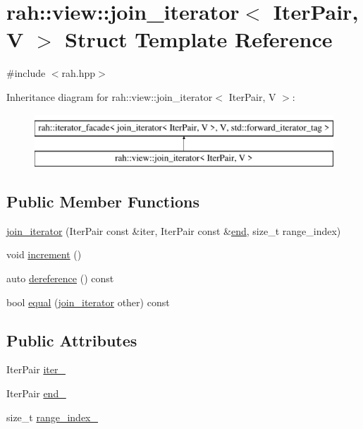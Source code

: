 \hypertarget{structrah_1_1view_1_1join__iterator}{}\section{rah\+::view\+::join\+\_\+iterator$<$ Iter\+Pair, V $>$ Struct Template Reference}
\label{structrah_1_1view_1_1join__iterator}


{\ttfamily \#include $<$rah.\+hpp$>$}

Inheritance diagram for rah\+::view\+::join\+\_\+iterator$<$ Iter\+Pair, V $>$\+:\begin{figure}[H]
\begin{center}
\leavevmode
\includegraphics[height=2.000000cm]{structrah_1_1view_1_1join__iterator}
\end{center}
\end{figure}
\subsection*{Public Member Functions}
\begin{DoxyCompactItemize}
\item 
\mbox{\hyperlink{structrah_1_1view_1_1join__iterator_aba8a1b69394f3be6cf7fa1425ab67c48}{join\+\_\+iterator}} (Iter\+Pair const \&iter, Iter\+Pair const \&\mbox{\hyperlink{namespacerah_aaddd1442cd76b96876e692cdefe7261d}{end}}, size\+\_\+t range\+\_\+index)
\item 
void \mbox{\hyperlink{structrah_1_1view_1_1join__iterator_ae9926cdadff37679e93cff974557e6a3}{increment}} ()
\item 
auto \mbox{\hyperlink{structrah_1_1view_1_1join__iterator_ad8eb100fae143db58474cdb02336fa84}{dereference}} () const
\item 
bool \mbox{\hyperlink{structrah_1_1view_1_1join__iterator_a6618d5fcc976f42b2d270ee3c4caa7fb}{equal}} (\mbox{\hyperlink{structrah_1_1view_1_1join__iterator}{join\+\_\+iterator}} other) const
\end{DoxyCompactItemize}
\subsection*{Public Attributes}
\begin{DoxyCompactItemize}
\item 
Iter\+Pair \mbox{\hyperlink{structrah_1_1view_1_1join__iterator_a53c423f97b1bb286a5eacd76de3d73c9}{iter\+\_\+}}
\item 
Iter\+Pair \mbox{\hyperlink{structrah_1_1view_1_1join__iterator_a7bd5e10c317952b8642e3eee04259413}{end\+\_\+}}
\item 
size\+\_\+t \mbox{\hyperlink{structrah_1_1view_1_1join__iterator_a7132064b94d8ae051bb8039fa1dfd4e0}{range\+\_\+index\+\_\+}}
\end{DoxyCompactItemize}


